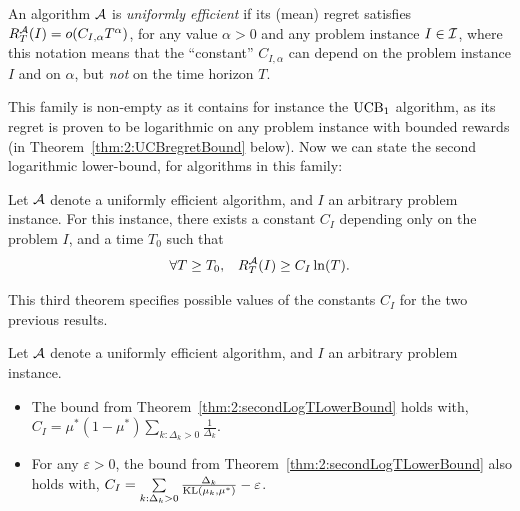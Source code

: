 \begin{defn}\label{def:2:uniformlyEfficientAlgorithm}
    An algorithm $\mathcal{A}$ is \emph{uniformly efficient} if its (mean) regret satisfies
    $R_T^{\mathcal{A}}(I) = \mathop{}\mathopen{}o\mathopen{}\left(C_{I,\alpha} T^{\alpha}\right)$,
    for any value $\alpha>0$ and any problem instance $I\in \mathcal{I}$,
    where this notation means that the ``constant'' $C_{I,\alpha}$ can depend on the problem instance $I$ and on $\alpha$, but \emph{not} on the time horizon $T$.
\end{defn}

This family is non-empty as it contains for instance the $\mathrm{UCB}_1$ algorithm, as its regret is proven to be logarithmic on any problem instance with bounded rewards (in Theorem~\ref{thm:2:UCBregretBound} below).
Now we can state the second logarithmic lower-bound, for algorithms in this family:

\begin{theorem}\label{thm:2:secondLogTLowerBound}
    Let $\mathcal{A}$ denote a uniformly efficient algorithm,
    and $I$ an arbitrary problem instance.
    For this instance,
    there exists a constant $C_I$ depending only on the problem $I$,
    and a time $T_0$ such that
    \begin{equation}
        \forall T \geq T_0, \;\;\; R_T^{\mathcal{A}}(I) \geq C_I \ln(T).
    \end{equation}
\end{theorem}

This third theorem specifies possible values of the constants $C_I$ for the two previous results.

\begin{theorem}\label{thm:2:forSecondLogTLowerBound}
    Let $\mathcal{A}$ denote a uniformly efficient algorithm,
    and $I$ an arbitrary problem instance.
    \begin{itemize}
        \item
        The bound from Theorem~\ref{thm:2:secondLogTLowerBound} holds with,
        $C_I = \mu^* (1 - \mu^*) \sum\limits_{k: \Delta_k > 0} \frac{1}{\Delta_k}$.
        \item
        For any $\varepsilon>0$, the bound from Theorem~\ref{thm:2:secondLogTLowerBound} also holds with,
        $C_I = \sum\limits_{k: \Delta_k > 0} \frac{\Delta_k}{\mathrm{KL}(\mu_k, \mu^*)} - \varepsilon$.
    \end{itemize}
\end{theorem}

